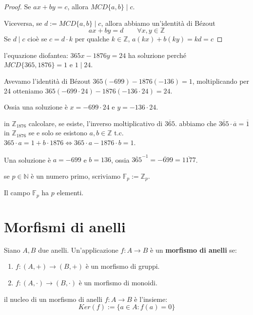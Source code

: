 \documentclass[../main.tex]{subfiles}
\begin{document}
\begin{proof}
    Se $ax + by = c$, allora $MCD \{a,b\} \mid c$.

    Viceversa, se $d := MCD \{a,b\} \mid c$, allora abbiamo un'identità di Bézout
    \begin{equation*}
        ax + by = d \qquad \forall x,y \in \mathbb{Z}
    \end{equation*}
    Se $d \mid c$ cioè se $c = d \cdot k$ per qualche $k \in \mathbb{Z} $, $a(kx) + b(ky) = kd = c$
\end{proof}

\begin{example}
    l'equazione diofantea: $365x - 1876y = 24$ ha soluzione perché $MCD \{365,1876\} = 1$ e $1 \mid 24$.

    Avevamo l'identità di Bézout $365(-699) - 1876(-136) = 1$, moltiplicando per 24 otteniamo $365(-699 \cdot 24) - 1876(-136 \cdot 24) = 24$.

    Ossia una soluzione è $x = -699 \cdot 24$ e $y = -136 \cdot 24$.
\end{example}

\begin{example}
    in $\mathbb{Z}_{1876}$ calcolare, se esiste, l'inverso moltiplicativo di $\overline{365}$. abbiamo che $\overline{365} \cdot \overline{a} = \overline{1}$ in $\mathbb{Z}_{1876}$ se e solo se esistono $a,b \in \mathbb{Z}$ t.c. $365 \cdot a = 1 + b \cdot 1876 \iff 365 \cdot a - 1876 \cdot b = 1$.

    Una soluzione è $a = -699$ e $b = 136$, ossia $\overline{365}^{-1} = \overline{-699} = \overline{1177}$.
\end{example}

\begin{remark}
    se $p \in \mathbb{N}$ è un numero primo, scriviamo $\mathbb{F}_p := \mathbb{Z}_p$.

    Il campo $\mathbb{F}_p$ ha $p$ elementi.
\end{remark}

\section{Morfismi di anelli}

\begin{definition}
    Siano $A,B$ due anelli. Un'applicazione $f : A \rightarrow B$ è un \textbf{morfismo di anelli} se:
    \begin{enumerate}[label=(\roman*)]
        \item $f: (A,+) \rightarrow (B,+)$ è un morfismo di gruppi.
        \item $f: (A,\cdot) \rightarrow (B,\cdot)$ è un morfismo di monoidi.
    \end{enumerate}
\end{definition}

\begin{definition}
    il nucleo di un morfismo di anelli $f : A \rightarrow B$ è l'insieme:
    \begin{equation*}
        Ker(f):=\{a \in A : f(a) = 0\}
    \end{equation*}
\end{definition}
\end{document}
